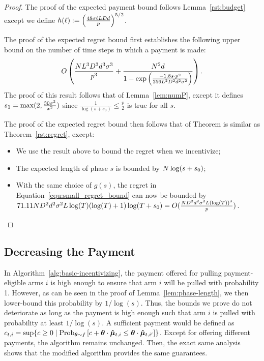 \begin{proof}
The proof of the expected payment bound follows Lemma~\ref{rst:budget} except we define $h(\ell) := 
\left( \frac{48 \sigma \ell L D d}{p} \right)^{5/2}$.

The proof of the expected regret bound first establishes the following upper bound on the number of time steps in which a payment is made:
\begin{align}
O\left(\frac{N L^3 D^3 d^3 \sigma^3}{p^3}
  + \frac{N^2 d}{1 - \exp \left(
    \frac{-1.8 s \cdot p^2}{256 L^2 D^2 d^2 \sigma^2}
  \right)} \right). \nonumber 
\end{align}
The proof of this result follows that of Lemma~\ref{lem:numP}, except it defines $s_1 = \max(2, \frac{30 \sigma^3}{x^3})$ since $\frac{1}{\log(s+s_0)}\leq \frac{p}{2}$ is true for all $s$.

The proof of the expected regret bound then follows that of Theorem is similar as Theorem~\ref{rst:regret}, except:
\begin{itemize}
\item We use the result above to bound the regret when we incentivize;
\item The expected length of phase $s$ is bounded by $N \log(s+s_0)$;
\item With the same choice of $g(s)$, the regret in Equation~\ref{equ:small_regret_bound} can now be bounded by $71.11 ND^2 d^2\sigma^2 L\log(T)(\log(T)+1)\log(T+s_0)=O(\frac{ND^2 d^2\sigma^2 L(\log(T))^3}{p})$.
\end{itemize}
\end{proof}


\subsection{Decreasing the Payment} \label{sec:pi}

In Algorithm~\ref{alg:basic-incentivizing},
the payment  offered for pulling payment-eligible arms $i$
is high enough to ensure that arm $i$ will be pulled with probability 1.
However, as can be seen in the proof of Lemma~\ref{lem:phase-length},
we then lower-bound this probability by $1/\log(s)$.
Thus, the bounds we prove do not deteriorate as long as the payment is
high enough such that arm $i$ is pulled with probability at least $1/\log(s)$.
A sufficient payment would be defined as
$\Pay{t}{i} = \sup \Set{c \geq 0}{%
  \Prob[\AgV \sim \AgentDist]{c + \AgV \cdot \ArmEV{t}{i} \leq \AgV \cdot \ArmEV{t}{i'}}}$.
Except for offering different payments, the algorithm remains unchanged.
Then, the exact same analysis shows that the modified algorithm
provides the same guarantees.
